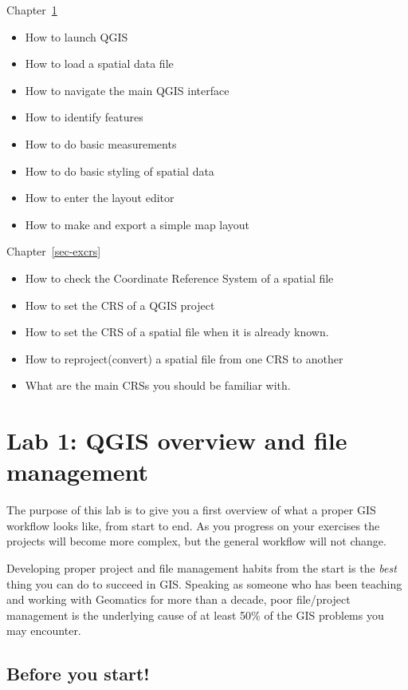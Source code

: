 \documentclass[
  letterpaper,
  DIV=11,
  numbers=noendperiod]{scrreprt}
\providecommand{\tightlist}{%
  \setlength{\itemsep}{0pt}\setlength{\parskip}{0pt}}\usepackage{longtable,booktabs,array}
\begin{document}
Chapter~\ref{sec-exoverview}

\begin{itemize}
\tightlist
\item
  How to launch QGIS
\item
  How to load a spatial data file
\item
  How to navigate the main QGIS interface
\item
  How to identify features
\item
  How to do basic measurements
\item
  How to do basic styling of spatial data
\item
  How to enter the layout editor
\item
  How to make and export a simple map layout
\end{itemize}

Chapter~\ref{sec-excrs}

\begin{itemize}
\tightlist
\item
  How to check the Coordinate Reference System of a spatial file
\item
  How to set the CRS of a QGIS project
\item
  How to set the CRS of a spatial file when it is already known.
\item
  How to reproject(convert) a spatial file from one CRS to another
\item
  What are the main CRSs you should be familiar with.
\end{itemize}

\chapter{Lab 1: QGIS overview and file management}\label{sec-exoverview}

The purpose of this lab is to give you a first overview of what a proper
GIS workflow looks like, from start to end. As you progress on your
exercises the projects will become more complex, but the general
workflow will not change.

Developing proper project and file management habits from the start is
the \emph{best} thing you can do to succeed in GIS. Speaking as someone
who has been teaching and working with Geomatics for more than a decade,
poor file/project management is the underlying cause of at least 50\% of
the GIS problems you may encounter.

\section{Before you start!}\label{before-you-start}
\end{document}
